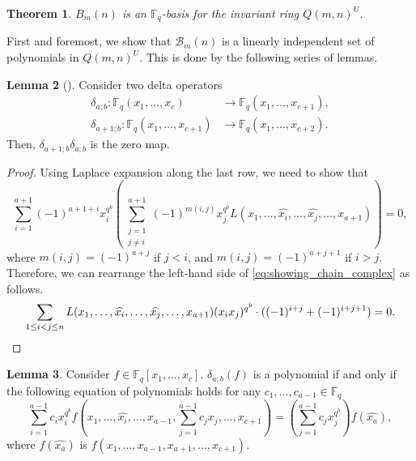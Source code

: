 \documentclass[12pt,a4paper]{report}
\newtheorem{theorem}{Theorem}[chapter]
\theoremstyle{definition}
\newtheorem{lemma}[theorem]{Lemma}
\theoremstyle{remark}
\theoremstyle{definition}
\begin{document}
\begin{theorem}
    \label{thm: q=p_case}
    $B_m(n)$ is an $\mathbb{F}_q$-basis for the invariant ring $Q(m, n)^{U}$.
\end{theorem}
First and foremost, we show that $\mathcal{B}_m(n)$ is a linearly independent set of polynomials in $Q(m, n)^U$. This is done by the following series of lemmas.
\begin{lemma}[{\cite[Propostition 8.4]{Ha_Hai_Nghia_2024}}]\label{lemma:chain_complex}
    Consider two delta operators
    \begin{align*}
        \delta_{a;b}:\mathbb{F}_q(x_1, \ldots, x_c)&\to \mathbb{F}_q(x_1, \ldots, x_{c+1}),\\
        \delta_{a+1;b}:\mathbb{F}_q(x_1, \ldots, x_{c+1})&\to \mathbb{F}_q(x_1, \ldots, x_{c+2}).
    \end{align*}
    Then, $\delta_{a+1;b}\delta_{a;b}$ is the zero map.
\end{lemma}
\begin{proof}
Using Laplace expansion along the last row, we need to show that
    \begin{equation}\label{eq:showing_chain_complex}
        \sum\limits_{i=1}^{a+1}(-1)^{a+1+i}x_i^{q^b}\left(\sum\limits_{\substack{j=1\\ j\neq i}}^{a+1}(-1)^{m(i, j)}x_j^{q^b}L(x_1, \ldots, \widehat{x_i}, \ldots, \widehat{x_j}, \ldots, x_{a+1})\right) = 0,
    \end{equation}
    where $m(i, j) = (-1)^{a+j}$ if $j<i$, and $m(i, j) = (-1)^{a+j+1}$ if $i>j$. Therefore, we can rearrange the left-hand side of \eqref{eq:showing_chain_complex} as follows.
    \begin{equation*}
        \sum\limits_{1\leq i < j\leq n}L(x_1, \ldots, \widehat{x_i}, \ldots, \widehat{x_j}, \ldots, x_{a+1})(x_i x_j)^{q^b}\cdot ((-1)^{i+j}+(-1)^{i+j+1}) = 0.\qedhere
    \end{equation*}
\end{proof}
\begin{lemma}\label{lemma:functional_eq}
    Consider $f\in \mathbb{F}_q[x_1, \ldots, x_c]$. $\delta_{a;b}(f)$ is a polynomial if and only if the following equation of polynomials holds for any $c_1, \ldots, c_{a-1}\in \mathbb{F}_q$
    \begin{equation}\label{eq:fundamental_functional_eq}
        \sum\limits_{i=1}^{a-1}c_i x_i^{q^b}f(x_1, \ldots, \widehat{x_i},\ldots, x_{a-1}, \sum\limits_{j=1}^{a-1}c_j x_j, \ldots, x_{c+1}) = \left(\sum\limits_{j=1}^{a-1}c_j x_j^{q^b}\right)f(\widehat{x_a}),
    \end{equation}
    where $f(\widehat{x_a})$ is $f(x_1, \ldots, x_{a-1}, x_{a+1}, \ldots, x_{c+1})$.
\end{lemma}
\end{document}
